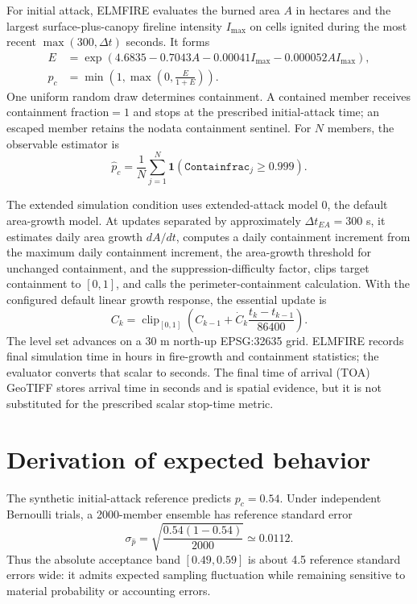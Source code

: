 For initial attack, ELMFIRE evaluates the burned area $A$ in hectares and the largest surface-plus-canopy fireline intensity $I_{\max}$ on cells ignited during the most recent $\max(300,\Delta t)$ seconds. It forms
\begin{align}
E &= \exp\!\left(4.6835-0.7043A-0.00041I_{\max}-0.000052AI_{\max}\right),\\
p_c &= \min\!\left(1,\max\!\left(0,\frac{E}{1+E}\right)\right).
\end{align}
One uniform random draw determines containment. A contained member receives containment fraction$=1$ and stops at the prescribed initial-attack time; an escaped member retains the nodata containment sentinel. For $N$ members, the observable estimator is
\begin{equation}
\widehat p_c=\frac{1}{N}\sum_{j=1}^{N}\mathbf{1}(\texttt{Containfrac}_j\ge0.999).
\end{equation}

The extended simulation condition uses extended-attack model 0, the default area-growth model. At updates separated by approximately $\Delta t_{EA}=300$ s, it estimates daily area growth $dA/dt$, computes a daily containment increment from the maximum daily containment increment, the area-growth threshold for unchanged containment, and the suppression-difficulty factor, clips target containment to $[0,1]$, and calls the perimeter-containment calculation. With the configured default linear growth response, the essential update is
\begin{equation}
C_{k}=\operatorname{clip}_{[0,1]}\!\left(C_{k-1}+\dot C_k\frac{t_k-t_{k-1}}{86400}\right).
\end{equation}
The level set advances on a 30 m north-up EPSG:32635 grid. ELMFIRE records final simulation time in hours in fire-growth and containment statistics; the evaluator converts that scalar to seconds. The final time of arrival (TOA) GeoTIFF stores arrival time in seconds and is spatial evidence, but it is not substituted for the prescribed scalar stop-time metric.

\section{Derivation of expected behavior}

The synthetic initial-attack reference predicts $p_c=0.54$. Under independent Bernoulli trials, a 2000-member ensemble has reference standard error
\begin{equation}
\sigma_{\widehat p}=\sqrt{\frac{0.54(1-0.54)}{2000}}\simeq0.0112.
\end{equation}
Thus the absolute acceptance band $[0.49,0.59]$ is about 4.5 reference standard errors wide: it admits expected sampling fluctuation while remaining sensitive to material probability or accounting errors.

